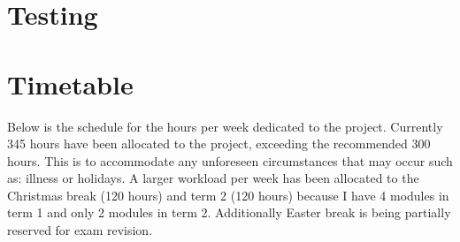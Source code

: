\documentclass{article}
\begin{document}
\section{Testing}

\section{Timetable}

Below is the schedule for the hours per week dedicated to the project. Currently 345 hours have been allocated to the project, exceeding the recommended 300 hours. This is to accommodate any unforeseen circumstances that may occur such as: illness or holidays. A larger workload per week has been allocated to the Christmas break (120 hours) and term 2 (120 hours) because I have 4 modules in term 1 and only 2 modules in term 2. Additionally Easter break is being partially reserved for exam revision.

% 
\end{document}
